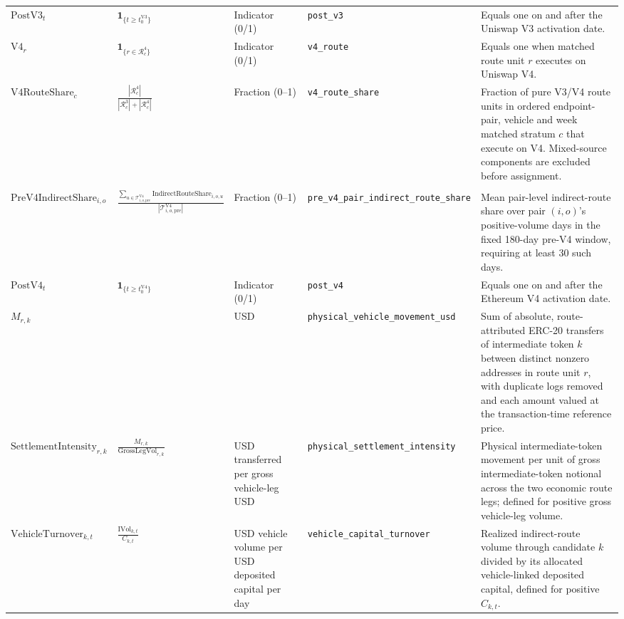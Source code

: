 \begin{tabularx}{\linewidth}{@{}>{\raggedright\arraybackslash}X>{\raggedright\arraybackslash}Xl>{\raggedright\arraybackslash}X>{\raggedright\arraybackslash}X@{}}
$\mathrm{PostV3}_{t}$ & $\mathbf{1}_{\{t\ge t^{\mathrm{V3}}_0\}}$ & Indicator (0/1) & \texttt{post\_\allowbreak{}v3} & Equals one on and after the Uniswap V3 activation date. \\
$\mathrm{V4}_{r}$ & $\mathbf{1}_{\{r\in\mathcal R^4_c\}}$ & Indicator (0/1) & \texttt{v4\_\allowbreak{}route} & Equals one when matched route unit $r$ executes on Uniswap V4. \\
$\mathrm{V4RouteShare}_{c}$ & $\displaystyle\frac{|\mathcal R^4_c|}{|\mathcal R^3_c|+|\mathcal R^4_c|}$ & Fraction (0--1) & \texttt{v4\_\allowbreak{}route\_\allowbreak{}share} & Fraction of pure V3/V4 route units in ordered endpoint-pair, vehicle and week matched stratum $c$ that execute on V4. Mixed-source components are excluded before assignment. \\
\addlinespace
\multicolumn{5}{@{}l}{\textit{V4 settlement implementation measures}} \\
$\mathrm{PreV4IndirectShare}_{i,o}$ & $\displaystyle\frac{\sum_{u\in\mathcal T^{\mathrm{V4}}_{i,o,\mathrm{pre}}}\mathrm{IndirectRouteShare}_{i,o,u}}{|\mathcal T^{\mathrm{V4}}_{i,o,\mathrm{pre}}|}$ & Fraction (0--1) & \texttt{pre\_\allowbreak{}v4\_\allowbreak{}pair\_\allowbreak{}indirect\_\allowbreak{}route\_\allowbreak{}share} & Mean pair-level indirect-route share over pair $(i,o)$'s positive-volume days in the fixed 180-day pre-V4 window, requiring at least 30 such days. \\
$\mathrm{PostV4}_{t}$ & $\mathbf{1}_{\{t\ge t^{\mathrm{V4}}_0\}}$ & Indicator (0/1) & \texttt{post\_\allowbreak{}v4} & Equals one on and after the Ethereum V4 activation date. \\
$M_{r,k}$ &  & USD & \texttt{physical\_\allowbreak{}vehicle\_\allowbreak{}movement\_\allowbreak{}usd} & Sum of absolute, route-attributed ERC-20 transfers of intermediate token $k$ between distinct nonzero addresses in route unit $r$, with duplicate logs removed and each amount valued at the transaction-time reference price. \\
$\mathrm{SettlementIntensity}_{r,k}$ & $\displaystyle\frac{M_{r,k}}{\mathrm{GrossLegVol}_{r,k}}$ & USD transferred per gross vehicle-leg USD & \texttt{physical\_\allowbreak{}settlement\_\allowbreak{}intensity} & Physical intermediate-token movement per unit of gross intermediate-token notional across the two economic route legs; defined for positive gross vehicle-leg volume. \\
$\mathrm{VehicleTurnover}_{k,t}$ & $\displaystyle\frac{\mathrm{IVol}_{k,t}}{C_{k,t}}$ & USD vehicle volume per USD deposited capital per day & \texttt{vehicle\_\allowbreak{}capital\_\allowbreak{}turnover} & Realized indirect-route volume through candidate $k$ divided by its allocated vehicle-linked deposited capital, defined for positive $C_{k,t}$. \\

\end{tabularx}
